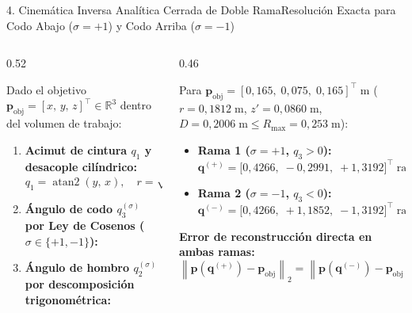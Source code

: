 \documentclass[aspectratio=169,10pt,xcolor=table]{beamer}
\newcommand{\Real}{\mathbb{R}}
\newcommand{\T}{^{\!\top}}
\newcommand{\norm}[1]{\left\lVert#1\right\rVert}
\begin{document}
\begin{frame}{4. Cinemática Inversa Analítica Cerrada de Doble Rama}{Resolución Exacta para Codo Abajo ($\sigma=+1$) y Codo Arriba ($\sigma=-1$)}
\begin{columns}[T,totalwidth=\textwidth]
  \begin{column}{0.52\textwidth}
    \begin{cajadef}
      \fontsize{6.7}{8.1}\selectfont
      Dado el objetivo $\bm{p}_{\text{obj}}=[x,\,y,\,z]\T\in\Real^3$ dentro del volumen de trabajo:
      \begin{enumerate}\setlength{\itemsep}{1.5pt}
        \item \textbf{Acimut de cintura $q_1$ y desacople cilíndrico:}
        \[
        q_1 = \operatorname{atan2}(y,\,x),\quad r=\sqrt{x^2+y^2},\quad z'=z-d_1
        \]
        \item \textbf{Ángulo de codo $q_3^{(\sigma)}$ por Ley de Cosenos ($\sigma\in\{+1,-1\}$):}\\[1mm]
        \item \textbf{Ángulo de hombro $q_2^{(\sigma)}$ por descomposición trigonométrica:}\\[1mm]
      \end{enumerate}
    \end{cajadef}
  \end{column}

  \begin{column}{0.46\textwidth}
    \begin{cajaidea}
      \fontsize{6.6}{8.0}\selectfont
      Para $\bm{p}_{\text{obj}}=[0{,}165,\;0{,}075,\;0{,}165]\T\;\text{m}$ ($r=0{,}1812\;\text{m}$, $z'=0{,}0860\;\text{m}$, $D=0{,}2006\;\text{m}\le R_{\max}=0{,}253\;\text{m}$):
      \begin{itemize}\setlength{\itemsep}{1.2pt}
        \item \textbf{Rama 1 ($\sigma=+1$, $q_3>0$):}
        $\bm{q}^{(+)} = \bigl[0{,}4266,\;-0{,}2991,\;+1{,}3192\bigr]\T\;\text{rad}$
        \item \textbf{Rama 2 ($\sigma=-1$, $q_3<0$):}
        $\bm{q}^{(-)} = \bigl[0{,}4266,\;+1{,}1852,\;-1{,}3192\bigr]\T\;\text{rad}$
      \end{itemize}
      \textbf{Error de reconstrucción directa en ambas ramas:}
      \[
      \norm{\bm{p}(\bm{q}^{(+)})-\bm{p}_{\text{obj}}}_2 = \norm{\bm{p}(\bm{q}^{(-)})-\bm{p}_{\text{obj}}}_2 = \mathbf{0{,}0000\;\text{mm}}
      \]
    \end{cajaidea}


\end{column}
\end{columns}
\end{frame}
\end{document}
